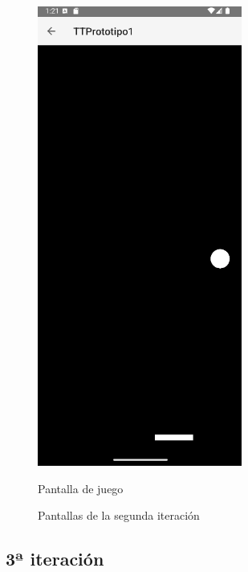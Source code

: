 \documentclass[a4paper,openright,12pt]{article}
\begin{document}
\begin{figure}[htp]
\begin{minipage}{0.3\textwidth}
        \includegraphics[width=0.6\textwidth]{Images/Vista_It2_3.png} 
        \caption{Pantalla de juego}
        \label{fig:Pantalla de juego}
    \end{minipage}
    \caption{Pantallas de la segunda iteración}
    \label{fig:segunda iteración}
\end{figure}

\subsection{3ª iteración}
\end{document}

